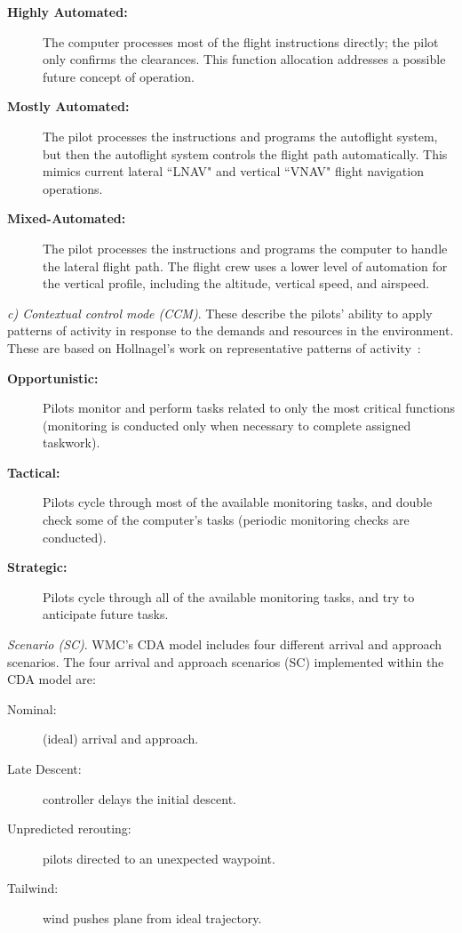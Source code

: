 \documentclass[journal]{IEEEtran}
\newcommand{\bd}{\begin{description}}
\newcommand{\ed}{\end{description}}
\newcommand{\be}{\begin{enumerate}}
\newcommand{\ee}{\end{enumerate}}
\begin{document}
\bd
\item[{\bf Highly Automated:}] The computer processes most of the flight instructions directly; the pilot only confirms the clearances. This function allocation addresses a possible future concept of operation.
\item[{\bf Mostly Automated:}] The pilot processes the instructions and programs the autoflight system, but then the autoflight
system controls the flight path automatically. This mimics current lateral ``LNAV" and vertical ``VNAV" flight navigation operations.
\item[{\bf Mixed-Automated:}] The pilot processes the instructions and programs the computer to handle the lateral flight path. The flight crew uses a lower level of automation for the vertical profile, including the altitude, vertical speed, and airspeed.
\ed

{\em c) Contextual control mode  (CCM)}. These describe the pilots' ability to apply patterns of activity in response to the demands and resources in the environment. These are based on Hollnagel's work on representative patterns of activity~\cite{Hollnagel1993}:
\bd
\item[{\bf Opportunistic:}] Pilots monitor and perform tasks related to only the most critical functions (monitoring is conducted only when necessary to complete assigned taskwork).
\item[{\bf Tactical:}] Pilots cycle through most of the available monitoring tasks, and double check some of the computer's tasks (periodic monitoring checks are conducted).
\item[{\bf Strategic:}] Pilots cycle through all of the available monitoring tasks, and try to anticipate future tasks.
\ed

{\em Scenario (SC)}.
WMC’s CDA model includes four different arrival and
approach scenarios. The four arrival and approach scenarios (SC) implemented within the CDA model are: 
\begin{description}
\item[Nominal:] (ideal) arrival and approach.
\item[Late Descent:] controller delays the initial descent.
\item[Unpredicted rerouting:]  pilots  directed to an unexpected waypoint.
\item[Tailwind:] wind  pushes  plane from  ideal trajectory.
\end{description} 

 
 
\end{document}
